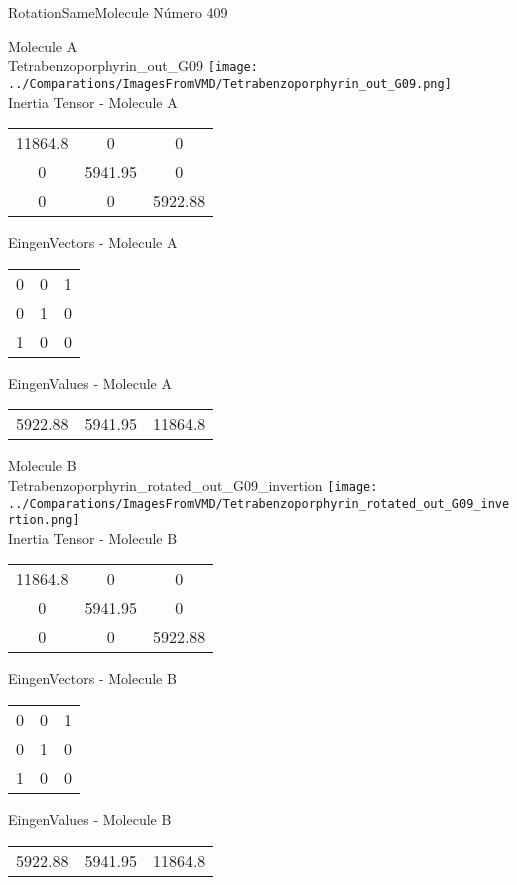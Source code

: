  \newpage

\vtab[-2cm]
\begin{center}
{\large RotationSameMolecule \tab Número 409}
\end{center}
\begin{multicols}{2}
\begin{center}

Molecule A \\ 
Tetrabenzoporphyrin\_out\_G09
\texttt{[image: ../Comparations/ImagesFromVMD/Tetrabenzoporphyrin\_out\_G09.png]}
\\
Inertia Tensor - Molecule A \\
\vtab

\begin{tabular}{|c c c|}
11864.8	 & 	0	 & 	0	 \\
0	 & 	5941.95	 & 	0	 \\
0	 & 	0	 & 	5922.88
\end{tabular}

\vtab
 EingenVectors - Molecule A     \\
\vtab
\begin{tabular}{|c c c|}
0	 & 	0	 & 	1	 \\
0	 & 	1	 & 	0	 \\
1	 & 	0	 & 	0
\end{tabular}

\vtab
 EingenValues - Molecule A     \\
\vtab
\begin{tabular}{|c c c|}
5922.88	 & 	5941.95	 & 	11864.8	 \\
\end{tabular}
\columnbreak

Molecule B \\ 
Tetrabenzoporphyrin\_rotated\_out\_G09\_invertion
\texttt{[image: ../Comparations/ImagesFromVMD/Tetrabenzoporphyrin\_rotated\_out\_G09\_invertion.png]}
\\
Inertia Tensor - Molecule B \\
\vtab

\begin{tabular}{|c c c|}
11864.8	 & 	0	 & 	0	 \\
0	 & 	5941.95	 & 	0	 \\
0	 & 	0	 & 	5922.88
\end{tabular}

\vtab
 EingenVectors - Molecule B     \\
\vtab
\begin{tabular}{|c c c|}
0	 & 	0	 & 	1	 \\
0	 & 	1	 & 	0	 \\
1	 & 	0	 & 	0
\end{tabular}

\vtab
 EingenValues - Molecule B     \\
\vtab
\begin{tabular}{|c c c|}
5922.88	 & 	5941.95	 & 	11864.8	 \\
\end{tabular}

\end{center}
\end{multicols}
